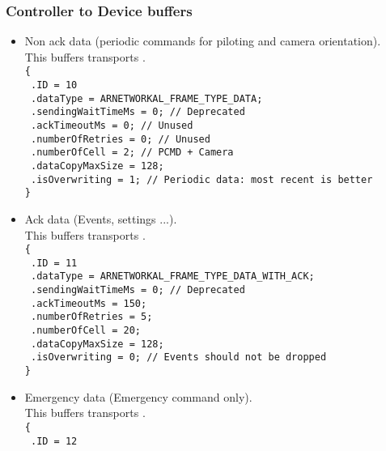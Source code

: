 \subsubsection*{Controller to Device buffers}
\begin{itemize}
\item{
    Non ack data (periodic commands for piloting and camera orientation).\\
    This buffers transports .\\
    \texttt{\{}\\
    \texttt{  .ID = 10}\\
    \texttt{  .dataType = ARNETWORKAL\_FRAME\_TYPE\_DATA;}\\
    \texttt{  .sendingWaitTimeMs = 0; // Deprecated}\\
    \texttt{  .ackTimeoutMs = 0; // Unused}\\
    \texttt{  .numberOfRetries = 0; // Unused}\\
    \texttt{  .numberOfCell = 2; // PCMD + Camera}\\
    \texttt{  .dataCopyMaxSize = 128;}\\
    \texttt{  .isOverwriting = 1; // Periodic data: most recent is better}\\
    \texttt{\}}
  }
\item{
    Ack data (Events, settings ...).\\
    This buffers transports .\\
    \texttt{\{}\\
    \texttt{  .ID = 11}\\
    \texttt{  .dataType = ARNETWORKAL\_FRAME\_TYPE\_DATA\_WITH\_ACK;}\\
    \texttt{  .sendingWaitTimeMs = 0; // Deprecated}\\
    \texttt{  .ackTimeoutMs = 150;}\\
    \texttt{  .numberOfRetries = 5;}\\
    \texttt{  .numberOfCell = 20;}\\
    \texttt{  .dataCopyMaxSize = 128;}\\
    \texttt{  .isOverwriting = 0; // Events should not be dropped}\\
    \texttt{\}}
}
\item{
    Emergency data (Emergency command only).\\
    This buffers transports .\\
    \texttt{\{}\\
    \texttt{  .ID = 12}\\
}
\end{itemize}
